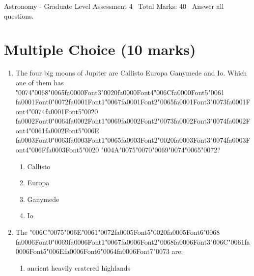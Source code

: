 \documentclass[12pt]{article}
\begin{document}
\begin{center}
Astronomy - Graduate Level Assessment 4 \
Total Marks: 40 \
Answer all questions.
\end{center}

\section*{Multiple Choice (10 marks)}
\begin{enumerate}[label=\arabic*.]
\item The four big moons of Jupiter are Callisto Europa Ganymede and Io. Which one of them has
{\char"0074}{\char"0068}{\char"0065}{\csname fa0000Font3\endcsname\char"0020}{\csname fa0000Font4\endcsname\char"006C}{\csname fa0000Font5\endcsname\char"0061} {\csname fa0001Font0\endcsname\char"0072}{\csname fa0001Font1\endcsname\char"0067}{\csname fa0001Font2\endcsname\char"0065}{\csname fa0001Font3\endcsname\char"0073}{\csname fa0001Font4\endcsname\char"0074}{\csname fa0001Font5\endcsname\char"0020} {\csname fa0002Font0\endcsname\char"0064}{\csname fa0002Font1\endcsname\char"0069}{\csname fa0002Font2\endcsname\char"0073}{\csname fa0002Font3\endcsname\char"0074}{\csname fa0002Font4\endcsname\char"0061}{\csname fa0002Font5\endcsname\char"006E} {\csname fa0003Font0\endcsname\char"0063}{\csname fa0003Font1\endcsname\char"0065}{\csname fa0003Font2\endcsname\char"0020}{\csname fa0003Font3\endcsname\char"0074}{\csname fa0003Font4\endcsname\char"006F}{\csname fa0003Font5\endcsname\char"0020} {\char"004A}{\char"0075}{\char"0070}{\char"0069}{\char"0074}{\char"0065}{\char"0072}?
\begin{enumerate}[label=(\alph*)]
    \item Callisto
    \item Europa
    \item Ganymede
    \item Io
\end{enumerate}
\item The {\char"006C}{\char"0075}{\char"006E}{\char"0061}{\char"0072}{\csname fa0005Font5\endcsname\char"0020}{\csname fa0005Font6\endcsname\char"0068} {\csname fa0006Font0\endcsname\char"0069}{\csname fa0006Font1\endcsname\char"0067}{\csname fa0006Font2\endcsname\char"0068}{\csname fa0006Font3\endcsname\char"006C}{\char"0061}{\csname fa0006Font5\endcsname\char"006E}{\csname fa0006Font6\endcsname\char"0064}{\csname fa0006Font7\endcsname\char"0073} are:
\begin{enumerate}[label=(\alph*)]
    \item ancient heavily cratered highlands

\end{enumerate}
\end{enumerate}
\end{document}
